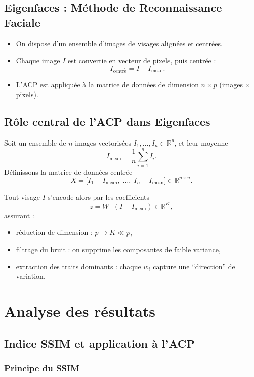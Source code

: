 \documentclass[a4paper,12pt]{report}
\begin{document}
\section{Eigenfaces : Méthode de Reconnaissance Faciale}
\begin{itemize}
  \item On dispose d’un ensemble d’images de visages alignées et centrées.
  \item Chaque image $I$ est convertie en vecteur de pixels, puis centrée :
    \[
      I_{\mathrm{centr\acute{e}}} = I - I_{\mathrm{mean}}.
    \]
  \item L’ACP est appliquée à la matrice de données de dimension $n \times p$ (images × pixels).
\end{itemize}

\section{Rôle central de l’ACP dans Eigenfaces}
Soit un ensemble de $n$ images vectorisées $I_1,\dots,I_n\in\mathbb{R}^p$, et leur moyenne
\[
  I_{\mathrm{mean}} = \frac{1}{n} \sum_{i=1}^n I_i.
\]
Définissons la matrice de données centrée
\[
  X = \bigl[I_1 - I_{\mathrm{mean}},\;\dots,\;I_n - I_{\mathrm{mean}}\bigr] \in \mathbb{R}^{p\times n}.
\]

Tout visage $I$ s'encode alors par les coefficients
\[
  z = W^{\top}(I - I_{\mathrm{mean}}) \in \mathbb{R}^K,
\]
assurant :
\begin{itemize}
  \item réduction de dimension : $p\to K\ll p$,  
  \item filtrage du bruit : on supprime les composantes de faible variance,  
  \item extraction des traits dominants : chaque $w_i$ capture une “direction” de variation.
\end{itemize}

\chapter{Analyse des résultats}

\section{Indice SSIM et application à l’ACP}

\subsection*{Principe du SSIM}
\end{document}
